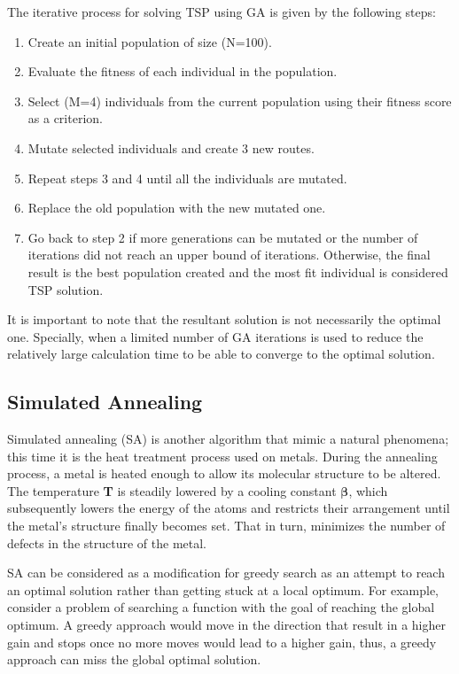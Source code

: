 \documentclass[twocolumn]{article}
\begin{document}
	The iterative process for solving TSP using GA is given by the following steps:
	\begin{enumerate}
		\item Create an initial population of size (N=100).
		\item Evaluate the fitness of each individual in the population.
		\item Select (M=4) individuals from the current population using their fitness score as a criterion.
		\item Mutate selected individuals and create 3 new routes.
		\item Repeat steps 3 and 4 until all the individuals are mutated.
		\item Replace the old population with the new mutated one.
		\item Go back to step 2 if more generations can be mutated or the number of iterations did not reach an upper bound of iterations. Otherwise, the final result is the best population created and the most fit individual is considered TSP solution.  
	\end{enumerate}
	It is important to note that the resultant solution is not necessarily the optimal one. Specially, when a limited number of GA iterations is used to reduce the relatively large calculation time to be able to converge to the optimal solution.
	
	\subsection{Simulated Annealing}
	 Simulated annealing (SA) is another algorithm that mimic a natural phenomena; this time it is the heat treatment process used on metals. During the annealing process, a metal is heated enough to allow its molecular structure to be altered. The temperature {\bfseries T} is steadily lowered by a cooling constant {$\boldsymbol \beta$}, which subsequently lowers the energy of the atoms and restricts their arrangement until the metal's structure finally becomes set. That in turn, minimizes the number of defects in the structure of the metal.
	 
	 SA can be considered as a modification for greedy search as an attempt to reach an optimal solution rather than getting stuck at a local optimum. For example, consider a problem of searching a function with the goal of reaching the global optimum. A greedy approach would move in the direction that result in a higher gain and stops once no more moves would lead to a higher gain, thus, a greedy approach can miss the global optimal solution.
	 
\end{document}
